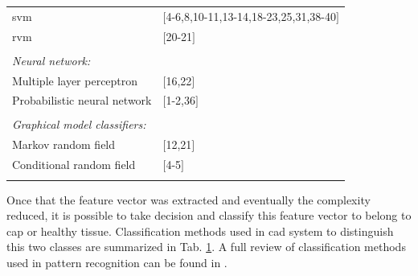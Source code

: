 \begin{table}
\begin{tabular}{p{.60\linewidth} p{.30\linewidth}}
		\quad \acs{svm} & $[$4-6,8,10-11,13-14,18-23,25,31,38-40$]$ \\
		\quad \acs{rvm} & $[$20-21$]$ \\ \\ [-1.5ex]
		\textit{Neural network:} & \\ 
		\quad Multiple layer perceptron & $[$16,22$]$ \\
		\quad Probabilistic neural network & $[$1-2,36$]$ \\ \\ [-1.5ex]
		\textit{Graphical model classifiers:} & \\
		\quad Markov random field & $[$12,21$]$ \\
		\quad Conditional random field & $[$4-5$]$ \\ \\ [-1.5ex]
		\hline
	\end{tabular}
	\label{tab:class}
\end{table}

Once that the feature vector was extracted and eventually the complexity reduced, it is possible to take decision and classify this feature vector to belong to \ac{cap} or healthy tissue. Classification methods used in \ac{cad} system to distinguish this two classes are summarized in Tab. \ref{tab:class}. A full review of classification methods used in pattern recognition can be found in \cite{Bishop2006}.

